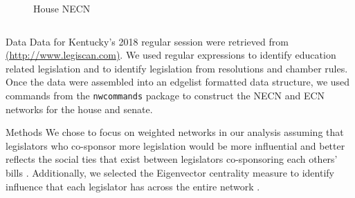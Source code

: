 \documentclass[final]{beamer}
\newlength{\onecolwid}
\newlength{\twocolwid}
\begin{document}
\begin{frame}[t]
\begin{columns}[t]
\begin{column}{\twocolwid}
\begin{columns}[t,totalwidth=\twocolwid]
\begin{column}{\onecolwid}
\begin{figure}
							\caption{House NECN \label{housenoned}}
						\end{figure}
					\end{column} %
				\end{columns} %
				\begin{block}{Data}
					Data for Kentucky's 2018 regular session were retrieved from \textcite{legiscan2018} 
					\url{(http://www.legiscan.com)}.  We used regular expressions to identify education related 
					legislation and to identify legislation from resolutions and chamber rules. \\
					Once the data were assembled into an edgelist formatted data structure, we used commands 
					from the \texttt{nwcommands} package \parencite{grund2015} to construct the NECN and ECN networks 
					for the house and senate. 
				\end{block}
				\begin{block}{Methods}
					We chose to focus on weighted networks in our analysis assuming that legislators who
					co-sponsor more legislation would be more influential and better reflects the social ties
					that exist between legislators co-sponsoring each others' bills \parencite{hangal2010}.  
					Additionally, we selected the Eigenvector centrality measure to identify influence that
					each legislator has across the entire network \parencite{landherr2010}.  
				\end{block}
				

\end{column}
\end{columns}
\end{frame}
\end{document}

